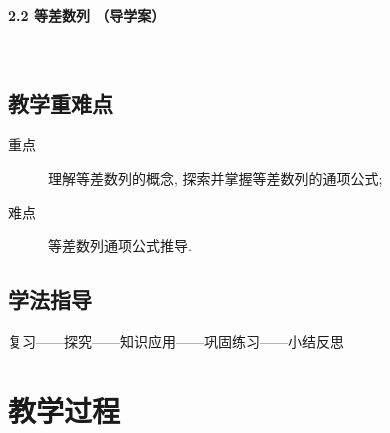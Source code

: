 \documentclass[10pt,a4paper]{article}
\begin{document}
\centerline{\Large{\textbf{2.2 等差数列 （导学案）}}}





　　		\subsection{教学重难点}

			\begin{description}

				\item[重点] 理解等差数列的概念, 探索并掌握等差数列的通项公式; 

				\item[难点] 等差数列通项公式推导. 

			\end{description}

		\subsection{学法指导}
			复习——探究——知识应用——巩固练习——小结反思



	\section{教学过程}


		
\end{document}
